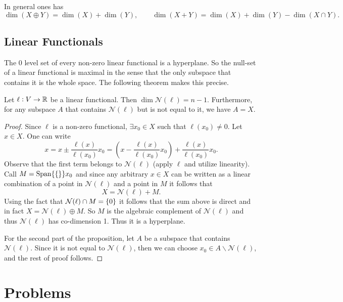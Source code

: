 \begin{proposition}
	In general ones has
	\[ \dim(X\oplus Y) = \dim(X) + \dim (Y), \qquad \dim(X+Y) = \dim(X) +\dim(Y) - \dim(X\cap Y). \]
\end{proposition}


\subsection{Linear Functionals}
The 0 level set of every non-zero linear functional is a hyperplane. So the null-set of a linear functional is maximal in the sense that the only subspace that contains it is the whole space. The following theorem makes this precise.

\begin{proposition}
	Let $ \ell:V\to \mathbb{R} $ be a linear functional. Then $ \dim \mathcal{N}(\ell) = n-1 $. Furthermore, for any subspace $ A $ that contains $ \mathcal{N}(\ell) $ but is not equal to it, we have $ A = X $. 
\end{proposition}
\begin{proof}
	Since $ \ell $ is a non-zero functional, $ \exists x_0 \in X $ such that $ \ell(x_0) \neq 0$. Let $ x \in X $. One can write
	\[ x = x \pm \frac{\ell(x)}{\ell(x_0)}x_0 = (x-\frac{\ell(x)}{\ell(x_0)}x_0) + \frac{\ell(x)}{\ell(x_0)}x_0. \]
	Observe that the first term belongs to $ \mathcal{N}(\ell) $ (apply $ \ell $ and utilize linearity). Call $ M = \operatorname{Span}\{\{\}\}{x_0} $ and since any arbitrary $ x\in X $ can be written as a linear combination of a point in $ \mathcal{N}(\ell) $ and a point in $ M $ it follows that
	\[ X = \mathcal{N}(\ell) + M. \]
	Using the fact that $ \mathcal{N}(\ell) \cap M = \{0\} $ it follows that the sum above is direct and in fact $ X = \mathcal{N}(\ell) \oplus M $. So $ M $ is the algebraic complement of $ \mathcal{N}(\ell) $ and thus $ \mathcal{N}(\ell) $ has co-dimension 1. Thus it is a hyperplane.
	
	For the second part of the proposition, let $ A $ be a subspace that contains $ \mathcal{N}(\ell) $. Since it is not equal to $ \mathcal{N}(\ell) $, then we can choose $ x_0 \in A \backslash\mathcal{N}(\ell) $, and the rest of proof follows. 
\end{proof}
 
 


\section{Problems}

